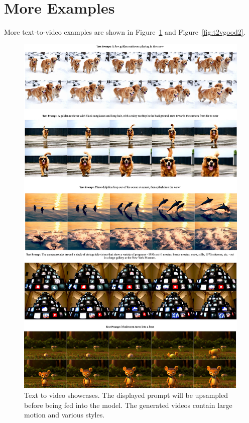 \section{More Examples}
More text-to-video examples are shown in Figure~\ref{fig:t2vgood1} and Figure~\ref{fig:t2vgood2}.

\begin{figure}[ht]
\vspace{-1em}
\begin{center}
\includegraphics[width=\linewidth]{images/goodcase3.jpg}
\end{center}
\caption{Text to video showcases. The displayed prompt will be upsampled before being fed into the model. The generated videos contain large motion and various styles.}
\label{fig:t2vgood1}
\end{figure}

